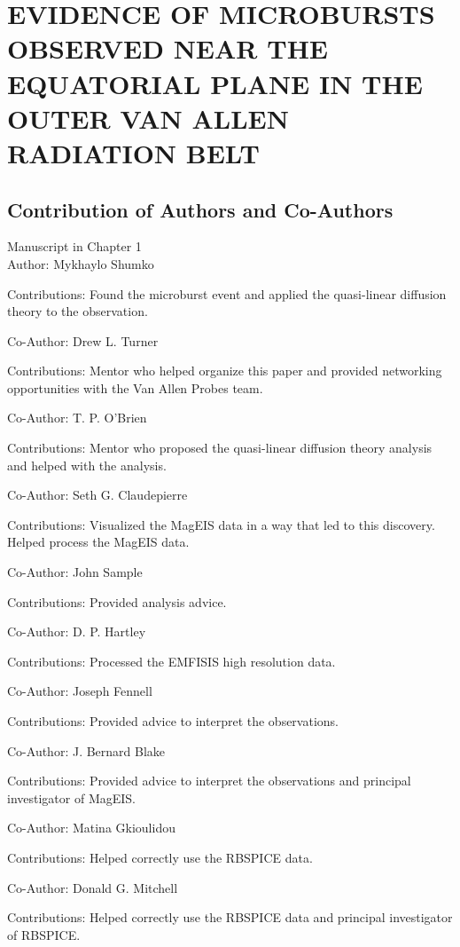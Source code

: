\chapter{EVIDENCE OF MICROBURSTS OBSERVED NEAR THE EQUATORIAL PLANE IN THE OUTER VAN ALLEN RADIATION BELT}\label{CH:mageis_microburst}

\section{Contribution of Authors and Co-Authors} 
\noindent Manuscript in Chapter 1 \\ 

\noindent Author: Mykhaylo Shumko
\begin{singlespace} \noindent Contributions: Found the microburst event and applied the quasi-linear diffusion theory to the observation. \end{singlespace}
\noindent Co-Author:  Drew L. Turner 
\begin{singlespace} \noindent Contributions: Mentor who helped organize this paper and provided networking opportunities with the Van Allen Probes team. \end{singlespace}
\noindent Co-Author: T. P. O'Brien
\begin{singlespace} \noindent Contributions: Mentor who proposed the quasi-linear diffusion theory analysis and helped with the analysis. \end{singlespace}
\noindent Co-Author:  Seth G. Claudepierre
\begin{singlespace} \noindent Contributions: Visualized the MagEIS data in a way that led to this discovery. Helped process the MagEIS data. \end{singlespace}
\noindent Co-Author: John Sample
\begin{singlespace} \noindent Contributions: Provided analysis advice. \end{singlespace}
\noindent Co-Author: D. P. Hartley
\begin{singlespace} \noindent Contributions: Processed the EMFISIS high resolution data. \end{singlespace}
\noindent Co-Author: Joseph Fennell
\begin{singlespace} \noindent Contributions: Provided advice to interpret the observations.\end{singlespace}
\noindent Co-Author: J. Bernard Blake
\begin{singlespace} \noindent Contributions: Provided advice to interpret the observations and principal investigator of MagEIS. \end{singlespace}
\newpage
\noindent Co-Author: Matina Gkioulidou
\begin{singlespace} \noindent Contributions: Helped correctly use the RBSPICE data. \end{singlespace}
\noindent Co-Author: Donald G. Mitchell
\begin{singlespace} \noindent Contributions: Helped correctly use the RBSPICE data and principal investigator of RBSPICE. \end{singlespace}

